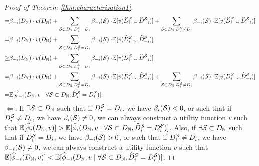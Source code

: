 \begin{proof}[Proof of Theorem \ref{thm:characterization1}]
\begin{align*}
		= & \beta_{-i}(D_{\mathbb{N}}) \cdot v(D_{\mathbb{N}}) +\sum_{\mathcal{S}\subset D_{\mathbb{N}}, D^{\mathcal{S}}_{i} = D_i} \beta_{-i}(\mathcal{S}) \cdot\! \mathbb{E}[v(\widehat{D}^{\mathcal{S}}_{i} \cup \widehat{D}^{\mathcal{S}}_{-i})] +\sum_{\mathcal{S}\subset D_{\mathbb{N}}, D^{\mathcal{S}}_{i} \neq D_i} \beta_{-i}(\mathcal{S}) \cdot\! \mathbb{E}[v(\widehat{D}^{\mathcal{S}}_{i} \cup \widehat{D}^{\mathcal{S}}_{-i})] \\
		= & \beta_{-i}(D_{\mathbb{N}}) \cdot v(D_{\mathbb{N}}) +\sum_{\mathcal{S}\subset D_{\mathbb{N}}, D^{\mathcal{S}}_{i} = D_i} \beta_{-i}(\mathcal{S}) \cdot\! \mathbb{E}[v(\widehat{D}^{\mathcal{S}}_{i} \cup \widehat{D}^{\mathcal{S}}_{-i})] \\
		\geq &\beta_{-i}(D_{\mathbb{N}}) \cdot v(D_{\mathbb{N}}) +\sum_{\mathcal{S}\subset D_{\mathbb{N}}, D^{\mathcal{S}}_{i} = D_i} \beta_{-i}(\mathcal{S}) \cdot\! \mathbb{E}[v(D^{\mathcal{S}}_{i} \cup \widehat{D}^{\mathcal{S}}_{-i})] \\
		= &\beta_{-i}(D_{\mathbb{N}}) \cdot v(D_{\mathbb{N}}) +\sum_{\mathcal{S}\subset D_{\mathbb{N}}, D^{\mathcal{S}}_{i} = D_i} \beta_{-i}(\mathcal{S}) \cdot\! \mathbb{E}[v(D^{\mathcal{S}}_{i} \cup \widehat{D}^{\mathcal{S}}_{-i})] +\sum_{\mathcal{S}\subset D_{\mathbb{N}}, D^{\mathcal{S}}_{i} \neq D_i} \beta_{-i}(\mathcal{S}) \cdot\! \mathbb{E}[v(D^{\mathcal{S}}_{i} \cup \widehat{D}^{\mathcal{S}}_{-i})]\\
		= & \mathbb{E}[\widehat{\phi}_{-i}(D_{\mathbb{N}}, v \mid \forall \mathcal{S} \subset D_{\mathbb{N}}, \widehat{D}^{\mathcal{S}}_{i} = D^{\mathcal{S}}_{i})].
	\end{align*}
	$\Leftarrow$: If $\exists \mathcal{S} \subset D_{\mathbb{N}}$ such that if $D^{\mathcal{S}}_{i} = D_i$, we have $\beta_i(\mathcal{S}) < 0$, or such that if $D^{\mathcal{S}}_{i} \neq D_i$, we have $\beta_i(\mathcal{S}) \neq 0$, we can always construct a utility function $v$ such that $\mathbb{E}[\widehat{\phi}_{i}(D_{\mathbb{N}}, v)] > \mathbb{E}[\widehat{\phi}_{i}(D_{\mathbb{N}}, v \mid \forall \mathcal{S} \subset D_{\mathbb{N}}, \widehat{D}^{\mathcal{S}}_{i} = D^{\mathcal{S}}_{i})]$. 
	Also, if $\exists \mathcal{S} \subset D_{\mathbb{N}}$ such that if $D^{\mathcal{S}}_{i} = D_i$, we have $\beta_{-i}(\mathcal{S}) > 0$, or such that if $D^{\mathcal{S}}_{i} \neq D_i$, we have $\beta_{-i}(\mathcal{S}) \neq 0$, we can always construct a utility function $v$ such that $\mathbb{E}[\widehat{\phi}_{-i}(D_{\mathbb{N}}, v)] < \mathbb{E}[\widehat{\phi}_{-i}(D_{\mathbb{N}}, v \mid \forall \mathcal{S} \subset D_{\mathbb{N}}, \widehat{D}^{\mathcal{S}}_{i} = D^{\mathcal{S}}_{i})]$.
\end{proof}

